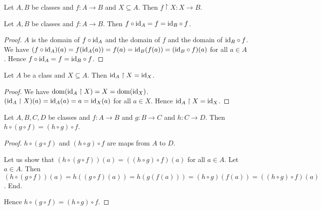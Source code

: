 \documentclass[10pt]{article}
\begin{document}
  \begin{forthel}
    \begin{proposition}[id=FOUNDATIONS_06_4078561256275968,printid]
      Let $A, B$ be classes and $f : A \to B$ and $X \subseteq A$.
      Then $f \restriction X : X \to B$.
    \end{proposition}
  \end{forthel}

  \begin{forthel}
    \begin{proposition}[id=FOUNDATIONS_06_3964401904254976,printid]
      Let $A, B$ be classes and $f : A \to B$.
      Then $f \circ \textrm{id}_{A} = f = \textrm{id}_{B} \circ f$.
    \end{proposition}
    \begin{proof}
      $A$ is the domain of $f \circ \textrm{id}_{A}$ and the domain of $f$ and the domain of $\textrm{id}_{B} \circ f$.
      We have $(f \circ \textrm{id}_{A})(a)
        = f(\textrm{id}_{A}(a))
        = f(a)
        = \textrm{id}_{B}(f(a))
        = (\textrm{id}_{B} \circ f)(a)$
      for all $a \in A$.
      Hence $f \circ \textrm{id}_{A}
        = f
        = \textrm{id}_{B} \circ f$.
    \end{proof}
  \end{forthel}

  \begin{forthel}
    \begin{proposition}[id=FOUNDATIONS_06_3118771061391360,printid]
      Let $A$ be a class and $X \subseteq A$.
      Then $\textrm{id}_{A} \restriction X = \textrm{id}_{X}$.
    \end{proposition}
    \begin{proof}
      We have $\operatorname{dom}(\textrm{id}_{A} \restriction X)
        = X
        = \operatorname{dom}(\textrm{id}_{X})$.
      $(\textrm{id}_{A} \restriction X)(a)
        = \textrm{id}_{A}(a)
        = a
        = \textrm{id}_{X}(a)$
      for all $a \in X$.
      Hence $\textrm{id}_{A} \restriction X = \textrm{id}_{X}$.
    \end{proof}
  \end{forthel}

  \begin{forthel}
    \begin{proposition}[id=FOUNDATIONS_06_6866147389472768,printid]
      Let $A, B, C, D$ be classes and $f : A \to B$ and $g : B \to C$ and $h : C \to D$.
      Then $h \circ (g \circ f) = (h \circ g) \circ f$.
    \end{proposition}
    \begin{proof}
      $h \circ (g \circ f)$ and $(h \circ g) \circ f$ are maps from $A$ to $D$.

      Let us show that $(h \circ (g \circ f))(a) = ((h \circ g) \circ f)(a)$ for all $a \in A$.
        Let $a \in A$.
        Then $(h \circ (g \circ f))(a)
          = h((g \circ f)(a))
          = h(g(f(a)))
          = (h \circ g)(f(a))
          = ((h \circ g) \circ f)(a)$.
      End.

      Hence $h \circ (g \circ f) = (h \circ g) \circ f$.
    \end{proof}
  \end{forthel}
\end{document}
